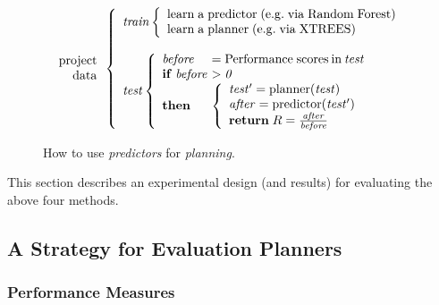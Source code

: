 \documentclass{sig-alternate}
\begin{document}
  
\begin{figure}[!b]
\small 
\[
\begin{array}{r}
\mathrm{project}\\
\mathrm{data}
\end{array} 
\left\{\begin{array}{l}\mathit{train}
        \left\{\begin{array}{l}
                \mathrm{learn\;a\;}\mathrm{predictor\;}\mathrm{(e.g.\;via \;Random\;Forest)}\\
                \mathrm{learn\;a\;}\mathrm{planner\;}\mathrm{(e.g.\;via \; XTREES)}
              \end{array}\right.
       \\
      ~\\
\mathit{test}  
    \left\{\begin{array}{l@{~}l}
           \mathit{before}& =\mathrm{Performance\; scores \hspace{2pt} in \hspace{2pt}}\mathit{test}\\
           \mathrm{\bf if\;}\mathit{before} & >  \mathit{0}\\
           \mathrm{\bf then} &
           \left\{
            \begin{array}{l}
                \mathit{test'} = \mathrm{planner}(\mathit{test})\\
                \mathit{after} =\mathrm{predictor}(\mathit{test'})\\ 
                \mathrm{{\bf return}\;} R=\frac{\mathit{after}}{\mathit{before}}
            \end{array}
          \right.
   \end{array}\right.
\end{array} \right. 
\]
 
\caption{How to use {\em predictors} for {\em planning}.}\label{fig:work}
\end{figure}

This section describes an experimental design (and results) for evaluating the above four methods. 

\subsection{A Strategy for Evaluation Planners}

\subsubsection{Performance Measures}
\end{document}

